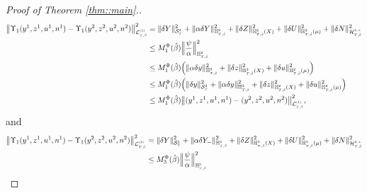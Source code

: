 \documentclass[10pt]{article} %
\newcommand\cH{\mathcal H}
\newcommand\cL{\mathcal L}
\newcommand\cS{\mathcal S}
\newcommand{\smalltext}[1]{\text{\fontsize{4}{4}\selectfont$#1$}}
\def \H{\mathbb{H}}
\newcommand{\1}{\mathbf{1}}
\begin{document}
\begin{proof}[Proof of Theorem \ref{thm::main}.]
\begin{align*}
		\big\| \Upsilon_1(y^1,z^1,u^1,n^1) - \Upsilon_1(y^2,z^2,u^2,n^2) \big\|^2_{\cL^\smalltext{(1)}_{\smalltext{T}\smalltext{,}\smalltext{\hat\beta}}} 
		&= \|\delta Y\|^2_{\cS^\smalltext{2}_\smalltext{T}} + \|\alpha\delta Y\|^2_{\H^\smalltext{2}_{\smalltext{T}\smalltext{,}\smalltext{\hat\beta}}} + \|\delta Z\|^2_{\H^\smalltext{2}_{\smalltext{T}\smalltext{,}\smalltext{\hat\beta}}(X)} + \|\delta U\|^2_{\H^\smalltext{2}_{\smalltext{T}\smalltext{,}\smalltext{\hat\beta}}(\mu)} + \|\delta N\|^2_{\cH^{\smalltext{2}\smalltext{,}\smalltext{\perp}}_{\smalltext{T}\smalltext{,}\smalltext{\hat\beta}}} \nonumber\\
		&\leq M^\Phi_1(\hat\beta) \Big\| \frac{\psi}{\alpha} \Big\|^2_{\H^\smalltext{2}_{\smalltext{T}\smalltext{,}\smalltext{\hat\beta}}} \nonumber\\
		&\leq M^\Phi_1(\hat\beta) \Big(\|\alpha\delta y\|^2_{\H^\smalltext{2}_{\smalltext{T}\smalltext{,}\smalltext{\hat\beta}}} + \|\delta z\|^2_{\H^\smalltext{2}_{\smalltext{T}\smalltext{,}\smalltext{\hat\beta}}(X)} + \|\delta u\|^2_{\H^\smalltext{2}_{\smalltext{T}\smalltext{,}\smalltext{\hat\beta}}(\mu)} \Big)  \nonumber\\
		&\leq M^\Phi_1(\hat\beta) \Big( \|\delta y\|^2_{\cS^\smalltext{2}_\smalltext{T}} + \|\alpha\delta y\|^2_{\H^\smalltext{2}_{\smalltext{T}\smalltext{,}\smalltext{\hat\beta}}} + \|\delta z\|^2_{\H^\smalltext{2}_{\smalltext{T}\smalltext{,}\smalltext{\hat\beta}}(X)} + \|\delta u\|^2_{\H^\smalltext{2}_{\smalltext{T}\smalltext{,}\smalltext{\hat\beta}}(\mu)} \Big)  \nonumber\\
		&\leq M^\Phi_1(\hat\beta) \big\|(y^1, z^1, u^1, n^1) - (y^2, z^2, u^2, n^2)\big\|^2_{\cL^\smalltext{(1)}_{\smalltext{T}\smalltext{,}\smalltext{\hat\beta}}},
	\end{align*}
	and
	\begin{align*}
		\big\| \Upsilon_1(y^1,z^1,u^1,n^1) - \Upsilon_1(y^2,z^2,u^2,n^2) \big\|^2_{\cL^\smalltext{(3)}_{\smalltext{T}\smalltext{,}\smalltext{\hat\beta}}} 
		&= \|\delta Y\|^2_{\cS^\smalltext{2}_\smalltext{T}} + \|\alpha\delta Y_-\|^2_{\H^\smalltext{2}_{\smalltext{T}\smalltext{,}\smalltext{\hat\beta}}} + \|\delta Z\|^2_{\H^\smalltext{2}_{\smalltext{T}\smalltext{,}\smalltext{\hat\beta}}(X)} + \|\delta U\|^2_{\H^\smalltext{2}_{\smalltext{T}\smalltext{,}\smalltext{\hat\beta}}(\mu)} + \|\delta N\|^2_{\cH^{\smalltext{2}\smalltext{,}\smalltext{\perp}}_{\smalltext{T}\smalltext{,}\smalltext{\hat\beta}}} \nonumber\\
		&\leq M^\Phi_3(\hat\beta)\Big\| \frac{\psi}{\alpha} \Big\|^2_{\H^\smalltext{2}_{\smalltext{T}\smalltext{,}\smalltext{\hat\beta}}} \nonumber\\

\end{align*}
\end{proof}
\end{document}
